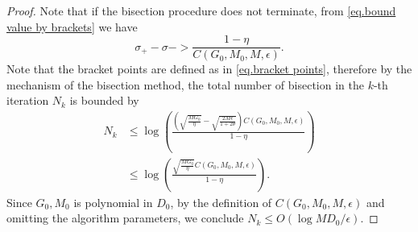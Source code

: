 \documentclass{mcom-l}
\numberwithin{equation}{section}
\begin{document}
\begin{proof}
    Note that if the bisection procedure does not terminate, from \eqref{eq.bound value by brackets} we have
    \begin{equation*}
        \sigma_+-\sigma- > \frac{1-\eta}{ C(G_0,M_0,M,\epsilon)}.
    \end{equation*}
    Note that the bracket points are defined as in \eqref{eq.bracket points}, therefore by the mechanism of the bisection method, the total number of bisection in the $k$-th iteration $N_k$ is bounded by
    \begin{equation*}
        \begin{aligned}
            N_k & \leq \log \left(\frac{\left(\sqrt{\frac{MG_0}{\eta}}-\sqrt{\frac{2M\epsilon}{1+2\theta}}\right)C(G_0,M_0,M,\epsilon)}{1-\eta}\right) \\
                & \leq \log \left(\frac{\sqrt{\frac{MG_0}{\eta}}C(G_0,M_0,M,\epsilon)}{1-\eta}\right).
        \end{aligned}
    \end{equation*}
    Since $G_0,M_0$ is polynomial in $D_0$, by the definition of $C(G_0,M_0,M,\epsilon)$ and omitting the algorithm parameters, we conclude $N_k \leq O\left(\log MD_0/\epsilon\right)$.
\end{proof}

% 
\end{document}
